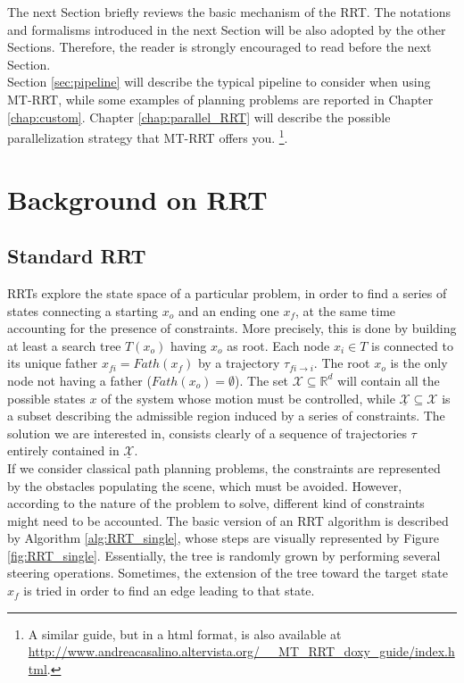 The next Section briefly reviews the basic mechanism of the RRT. The notations and formalisms introduced in the next Section will be also adopted by the other Sections. Therefore, the reader is strongly encouraged to read before the next Section.
\\
Section \ref{sec:pipeline} will describe the typical pipeline to consider when using MT-RRT, while some examples of planning problems are reported in Chapter \ref{chap:custom}. Chapter \ref{chap:parallel_RRT} will describe the possible parallelization strategy that MT-RRT offers you.
\footnote{A similar guide, but in a html format, is also available at \url{http://www.andreacasalino.altervista.org/__MT_RRT_doxy_guide/index.html}.}.

\section{Background on RRT}

\subsection{Standard RRT}
\label{sec:RRT_single}

RRTs explore the state space of a particular problem, in order to find a series of states connecting a starting $x_o$ and an ending one $x_f$, at the same time accounting for the presence of constraints. More precisely, this is done by building at least a search tree $T(x_o)$ having $x_o$ as root. Each node $x_i \in T$ is connected to its unique father $x_{fi}=Fath(x_f)$ by a trajectory $\tau_{fi \rightarrow i}$.
The root $x_o$ is the only node not having a father ($Fath(x_o)=\emptyset$). 
The set $\mathcal{X} \subseteq \mathbb{R}^{d} $ will contain all the possible states $x$ of the system whose motion must be controlled, while $\underline{\mathcal{X}} \subseteq \mathcal{X}$ is a subset describing the admissible region induced by a series of constraints. 
The solution we are interested in, consists clearly of a sequence of trajectories $\tau$ entirely contained in $\underline{\mathcal{X}}$.
\\
If we consider classical path planning problems, the constraints are represented by the obstacles populating the scene, which must be avoided.
However, according to the nature of the problem to solve, different kind of constraints might need to be accounted.
The basic version of an RRT algorithm is described by Algorithm \ref{alg:RRT_single}, whose steps are visually represented by Figure \ref{fig:RRT_single}.
Essentially, the tree is randomly grown by performing several steering operations. Sometimes, the extension of the tree toward the target state $x_f$ is tried in order to find an edge leading to that state.

